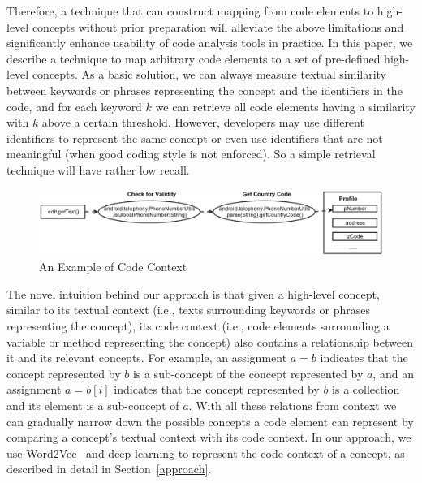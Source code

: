 Therefore, a technique that can construct mapping from code elements to high-level concepts without prior preparation will alleviate the above limitations and significantly enhance usability of code analysis tools in practice. In this paper, we describe a technique to map arbitrary code elements to a set of pre-defined high-level concepts. As a basic solution, we can always measure textual similarity between keywords or phrases representing the concept and the identifiers in the code, and for each keyword $k$ we can retrieve all code elements having a similarity with $k$ above a certain threshold. However, developers may use different identifiers to represent the same concept or even use identifiers that are not meaningful (when good coding style is not enforced). So a simple retrieval technique will have rather low recall.

\begin{figure}
	\centering
	\includegraphics[scale=.2]{figures/example_computationOld.png}
	\vspace{-.6cm}

	\caption{An Example of Code Context}
	\vspace{-.6cm}

	\label{example}
\end{figure}


The novel intuition behind our approach is that given a high-level concept, similar to its textual context (i.e., texts surrounding keywords or phrases representing the concept), its code context (i.e., code elements surrounding a variable or method representing the concept) also contains a relationship between it and its relevant concepts. For example, an assignment $a = b$ indicates that the concept represented by $b$ is a sub-concept of the concept represented by $a$, and an assignment $a = b[i]$ indicates that the concept represented by $b$ is a collection and its element is a sub-concept of $a$. With all these relations from context we can gradually narrow down the possible concepts a code element c{\tiny }an represent by comparing a concept's textual context with its code context. In our approach, we use Word2Vec~\cite{mikolov2013efficient} and deep learning to represent the code context of a concept, as described in detail in Section~\ref{approach}.


